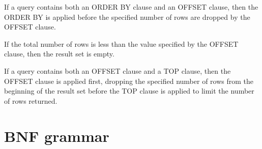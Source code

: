 \documentclass[11pt,a4paper]{ivoa}
\begin{document}
If a query contains both an ORDER BY clause and an OFFSET clause,
then the ORDER BY is applied before the specified number of 
rows are dropped by the OFFSET clause.

If the total number of rows is less than the value
specified by the OFFSET clause, then the result set is empty.

If a query contains both an OFFSET clause and a TOP clause,
then the OFFSET clause is applied first, dropping the specified
number of rows from the beginning of the result set before the
TOP clause is applied to limit the number of rows returned.

\clearpage %
\appendix
\section{BNF grammar}
\label{sec:grammar}
\end{document}
